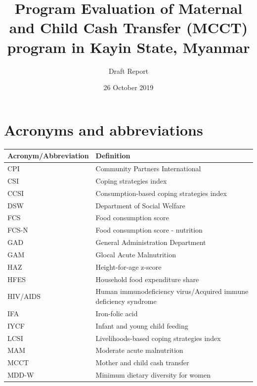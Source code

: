 \documentclass[12pt,a4paper]{article}
\title{\vspace{8cm} \LARGE{Program Evaluation of Maternal and Child Cash Transfer (MCCT) program in Kayin State, Myanmar}}
\subtitle{Draft Report}
\author{}
\date{26 October 2019}
\begin{document}
\maketitle

\newpage

{
\hypersetup{linkcolor=black}
\setcounter{tocdepth}{4}
\tableofcontents
}
\listoftables
\listoffigures
\newpage

\hypertarget{acronyms-and-abbreviations}{%
\section*{Acronyms and abbreviations}\label{acronyms-and-abbreviations}}

\begin{table}[H]
\centering
\begin{tabular}{l>{\raggedright\arraybackslash}p{8cm}}
\toprule
\textbf{Acronym/Abbreviation} & \textbf{Definition}\\
\midrule
\rowcolor{gray!6}  CPI & Community Partners International\\
CSI & Coping strategies index\\
\rowcolor{gray!6}  CCSI & Consumption-based coping strategies index\\
DSW & Department of Social Welfare\\
\rowcolor{gray!6}  FCS & Food consumption score\\
\addlinespace
FCS-N & Food consumption score - nutrition\\
\rowcolor{gray!6}  GAD & General Administration Department\\
GAM & Glocal Acute Malnutrition\\
\rowcolor{gray!6}  HAZ & Height-for-age z-score\\
HFES & Household food expenditure share\\
\addlinespace
\rowcolor{gray!6}  HIV/AIDS & Human immunodeficiency virus/Acquired immune deficiency syndrome\\
IFA & Iron-folic acid\\
\rowcolor{gray!6}  IYCF & Infant and young child feeding\\
LCSI & Livelihoods-based coping strategies index\\
\rowcolor{gray!6}  MAM & Moderate acute malnutrition\\
\addlinespace
MCCT & Mother and child cash transfer\\
\rowcolor{gray!6}  MDD-W & Minimum dietary diversity for women\\

\end{tabular}
\end{table}
\end{document}
